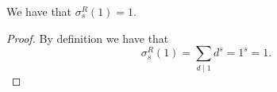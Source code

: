 \begin{theorem}
\label{sigmaR_one}
\leanok
We have that $\sigma^R_s(1)=1$.
\end{theorem}
\begin{proof}
\leanok
By definition we have that
    $$\sigma^R_s(1)=\sum_{d \mid 1}d^s=1^s=1.$$
\end{proof}
